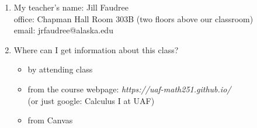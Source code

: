 \documentclass[11pt,fleqn]{article}
\begin{document}
\renewcommand{\headrulewidth}{0pt}
\newcommand{\blank}[1]{\rule{#1}{0.75pt}}
\renewcommand{\d}{\displaystyle}
\vspace*{-0.7in}
\begin{center}
  \large {}
\end{center}


\begin{enumerate}
\item My teacher's name: Jill Faudree\\ 
office: Chapman Hall Room 303B (two floors above our classroom)\\ 
email:  jrfaudree@alaska.edu\\
\item Where can I get information about this class?\\
\begin{itemize}
\item by attending class
\item from the course webpage: \textit{https://uaf-math251.github.io/} \\(or just google: Calculus I at UAF)
\item from Canvas
\end{itemize}


\end{enumerate}
\end{document}
